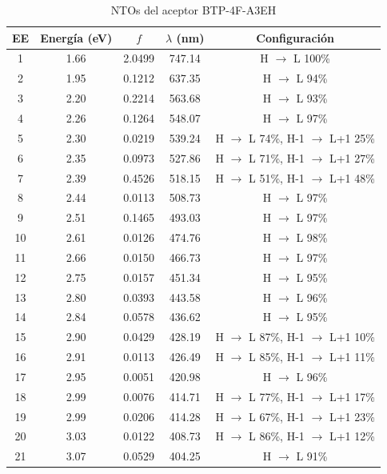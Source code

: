 \begin{table}[H]
\caption{NTOs del aceptor BTP-4F-A3EH}
\label{table:R25B-8} \vspace{-0.5cm}
{\footnotesize
\begin{center} 
\begin{tabular}{ccccc}
\hline
EE & Energía (eV) & $f$ & $\lambda$ (nm) & Configuración \\ \hline
1 & 1.66 & 2.0499 & 747.14 & H $\rightarrow$ L 100\% \\
2 & 1.95 & 0.1212 & 637.35 & H $\rightarrow$ L 94\% \\
3 & 2.20 & 0.2214 & 563.68 & H $\rightarrow$ L 93\% \\
4 & 2.26 & 0.1264 & 548.07 & H $\rightarrow$ L 97\% \\
5 & 2.30 & 0.0219 & 539.24 & H $\rightarrow$ L 74\%, H-1 $\rightarrow$ L+1 25\% \\
6 & 2.35 & 0.0973 & 527.86 & H $\rightarrow$ L 71\%, H-1 $\rightarrow$ L+1 27\% \\
7 & 2.39 & 0.4526 & 518.15 & H $\rightarrow$ L 51\%, H-1 $\rightarrow$ L+1 48\% \\
8 & 2.44 & 0.0113 & 508.73 & H $\rightarrow$ L 97\% \\
9 & 2.51 & 0.1465 & 493.03 & H $\rightarrow$ L 97\% \\
10 & 2.61 & 0.0126 & 474.76 & H $\rightarrow$ L 98\% \\
11 & 2.66 & 0.0150 & 466.73 & H $\rightarrow$ L 97\% \\
12 & 2.75 & 0.0157 & 451.34 & H $\rightarrow$ L 95\% \\
13 & 2.80 & 0.0393 & 443.58 & H $\rightarrow$ L 96\% \\
14 & 2.84 & 0.0578 & 436.62 & H $\rightarrow$ L 95\% \\
15 & 2.90 & 0.0429 & 428.19 & H $\rightarrow$ L 87\%, H-1 $\rightarrow$ L+1 10\% \\
16 & 2.91 & 0.0113 & 426.49 & H $\rightarrow$ L 85\%, H-1 $\rightarrow$ L+1 11\% \\
17 & 2.95 & 0.0051 & 420.98 & H $\rightarrow$ L 96\% \\
18 & 2.99 & 0.0076 & 414.71 & H $\rightarrow$ L 77\%, H-1 $\rightarrow$ L+1 17\% \\
19 & 2.99 & 0.0206 & 414.28 & H $\rightarrow$ L 67\%, H-1 $\rightarrow$ L+1 23\% \\
20 & 3.03 & 0.0122 & 408.73 & H $\rightarrow$ L 86\%, H-1 $\rightarrow$ L+1 12\% \\
21 & 3.07 & 0.0529 & 404.25 & H $\rightarrow$ L 91\% \\

\end{tabular}
\end{center}}
\end{table}
